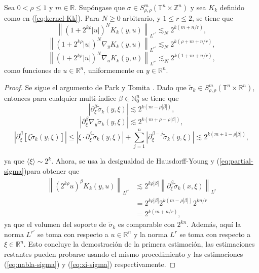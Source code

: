 \begin{lemma}
	Sea $0 < \rho \leq 1$ y $m\in \mathbb{R}$. Supóngase que $\sigma \in S^m_{\rho,\rho}(\mathbb{T}^n \times \mathbb{Z}^n) $ y sea $K_k$ definido como en (\ref{eq:kernel-Kk}). Para $N\geq 0$ arbitrario, y $1\leq r\leq 2$, se tiene que 
	\begin{equation*}
		\left\| (1+2^{k\rho}|u|)^N K_k(y, u)
		\right\|_{L^{r'}} \lesssim_N 2^{k(m+n/r)},
	\end{equation*}
	\begin{equation*}
		\left\| (1+2^{k\rho}|u|)^N \nabla_y K_k(y, u)
		\right\|_{L^{r'}} \lesssim_N 2^{k(\rho+m+n/r)},
	\end{equation*}
	\begin{equation*}
		\left\| (1+2^{k\rho}|u|)^N \nabla_u K_k(y, u)
		\right\|_{L^{r'}} \lesssim_N 2^{k(1+m+n/r)},
	\end{equation*}
	como funciones de $u\in\mathbb{R}^n$, uniformemente en $y\in\mathbb{R}^n$.
	\label{lem:kernel-estimates}
\end{lemma}
\begin{proof}
	Se sigue el argumento de Park y Tomita \cite{park-tomita}. Dado que $\tilde{\sigma}_k \in S^m_{\rho,\rho}(\mathbb{T}^n \times \mathbb{R}^n) $, entonces para cualquier multi-índice $\beta\in \mathbb{N}_0^n$ se tiene que
	\begin{equation}
		\left|\partial_\xi^\beta \tilde{\sigma}_k(y, \xi)\right| \lesssim 2^{k(m-\rho|\beta|)},
		\label{eq:partial-sigma}
	\end{equation}
	\begin{equation}
		\left|\partial_\xi^\beta \nabla_y \tilde{\sigma}_k(y, \xi)\right| \lesssim 2^{k(m+\rho-\rho|\beta|)},
		\label{eq:nabla-sigma}
	\end{equation}
	\begin{equation}
		\left|\partial_\xi^\beta [\xi  \tilde{\sigma}_k(y, \xi)]\right| \leq 
		\left|\xi\cdot\partial_\xi^\beta \tilde{\sigma}_k(y,\xi)\right| + \sum_{j=1}^n \left| \partial_\xi^{\beta-j} \tilde{\sigma}_k(y,\xi) \right|
		\lesssim
		2^{k(m+1-\rho|\beta|)},
		\label{eq:xi-sigma}
	\end{equation}
	
	ya que $\langle\xi\rangle \sim 2^k$. Ahora, se usa la desigualdad de Hausdorff-Young y (\ref{eq:partial-sigma})para obtener que
	\begin{align*}
		\left\| (2^{k\rho}u)^\beta K_k(y, u)
		\right\|_{L^{r'}} & \lesssim2^{k\rho|\beta|} \left\| 
		\partial_\xi^\beta \tilde{\sigma}_k(x, \xi)
		\right\|_{L^{r}} \\
		& = 2^{k\rho|\beta|} 2^{k(m-\rho|\beta|)} 2^{kn/r} \\
		& =  2^{k(m+n/r)},
	\end{align*}
	ya que el volumen del soporte de $\tilde{\sigma}_k$ es comparable con $2^{kn}$. Además, aquí la norma $L^{r'}$ se toma con respecto a $u \in \mathbb{R}^n$ y la norma $L^{r}$ se toma con respecto a $\xi\in\mathbb{R}^n$. Esto concluye la demostración de la primera estimación, las estimaciones restantes pueden probarse usando el mismo procedimiento y las estimaciones (\ref{eq:nabla-sigma}) y (\ref{eq:xi-sigma}) respectivamente.
\end{proof}
